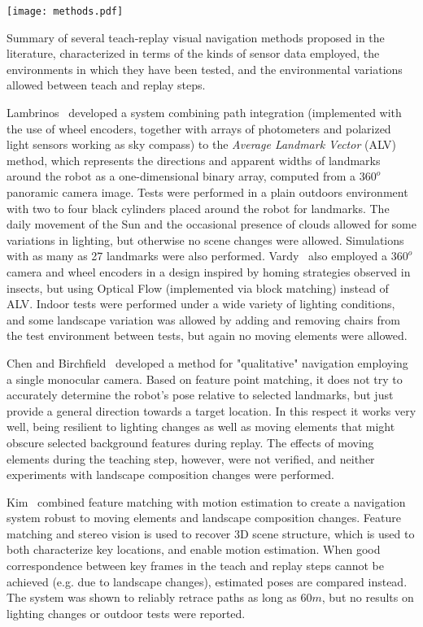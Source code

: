 \documentclass[twocolumn, 9pt,fleqn]{jsproceedings}
\begin{document}
\begin{table}[h!]
\centering
\texttt{[image: methods.pdf]}
\caption{Summary of several teach-replay visual navigation methods proposed in the literature, characterized in terms of the kinds of sensor data employed, the environments in which they have been tested, and the environmental variations allowed between teach and replay steps.}
\label{tab:methods}
\end{table}

Lambrinos~\cite{LAM00} developed a system combining path integration (implemented with the use of wheel encoders, together with arrays of photometers and polarized light sensors working as sky compass) to the \textit{Average Landmark Vector} (ALV) method, which represents the directions and apparent widths of landmarks around the robot as a one-dimensional binary array, computed from a $360^o$ panoramic camera image. Tests were performed in a plain outdoors environment with two to four black cylinders placed around the robot for landmarks. The daily movement of the Sun and the occasional presence of clouds allowed for some variations in lighting, but otherwise no scene changes were allowed. Simulations with as many as 27 landmarks were also performed. Vardy~\cite{VAR05} also employed a $360^o$ camera and wheel encoders in a design inspired by homing strategies observed in insects, but using Optical Flow (implemented via block matching) instead of ALV. Indoor tests were performed under a wide variety of lighting conditions, and some landscape variation was allowed by adding and removing chairs from the test environment between tests, but again no moving elements were allowed.

Chen and Birchfield~\cite{CHE06} developed a method for "qualitative" navigation employing a single monocular camera. Based on feature point matching, it does not try to accurately determine the robot's pose relative to selected landmarks, but just provide a general direction towards a target location. In this respect it works very well, being resilient to lighting changes as well as moving elements that might obscure selected background features during replay. The effects of moving elements during the teaching step, however, were not verified, and neither experiments with landscape composition changes were performed.

Kim~\cite{KIM08} combined feature matching with motion estimation to create a navigation system robust to moving elements and landscape composition changes. Feature matching and stereo vision is used to recover 3D scene structure, which is used to both characterize key locations, and enable motion estimation. When good correspondence between key frames in the teach and replay steps cannot be achieved (e.g. due to landscape changes), estimated poses are compared instead. The system was shown to reliably retrace paths as long as $60m$, but no results on lighting changes or outdoor tests were reported.
\end{document}
